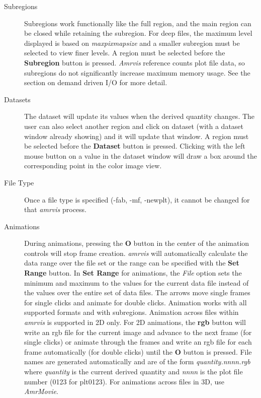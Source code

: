 \documentclass{article}
\begin{document}
\begin{description}
\item [Subregions] Subregions work functionally like the full region,
and the main region can be closed while retaining the subregion.
For deep files, the maximum level displayed is based on {\em maxpixmapsize}
and a smaller subregion must be selected to view finer levels.
A region must be selected before the {\bf Subregion} button is pressed.
{\em Amrvis} reference counts plot file data, so subregions do not
significantly increase maximum memory usage.  See the section on
demand driven I/O for more detail.

\item [Datasets]  The dataset will update its values when
the derived quantity changes.  The user can also select another region
and click on dataset (with a dataset window already showing) and it
will update that window.
A region must be selected before the {\bf Dataset} button is
pressed.  Clicking with the left mouse button on a value in the
dataset window will draw a box around the corresponding point in the
color image view.

\item [File Type]
Once a file type is specified (-fab, -mf, -newplt), it cannot be
changed for that {\em amrvis} process.

\item [Animations] During animations, pressing the {\bf O} button
in the center of the animation controls will stop frame creation.
{\em amrvis} will automatically calculate the data range over
the file set or the range can be specified with the {\bf Set Range} button.
In {\bf Set Range} for animations, the {\em File} option sets
the minimum and maximum to the values for the current data file
instead of the values over the entire set of data files.
The arrows move single frames for single clicks and animate for double clicks.
Animation works with all supported formats and with subregions.
Animation across files within {\em amrvis} is supported in 2D only.
For 2D animations, the {\bf rgb} button will write an rgb file
for the current image and advance to the next frame (for single clicks)
or animate through the frames and write an rgb file for each frame
automatically (for double clicks) until the {\bf O} button is pressed.
File names are generated automatically and are of the form
{\em quantity.nnnn.rgb} where {\em quantity} is the current derived quantity and
{\em nnnn} is the plot file number (0123 for plt0123).
For animations across files in 3D, use {\em AmrMovie}.


\end{description}
\end{document}
